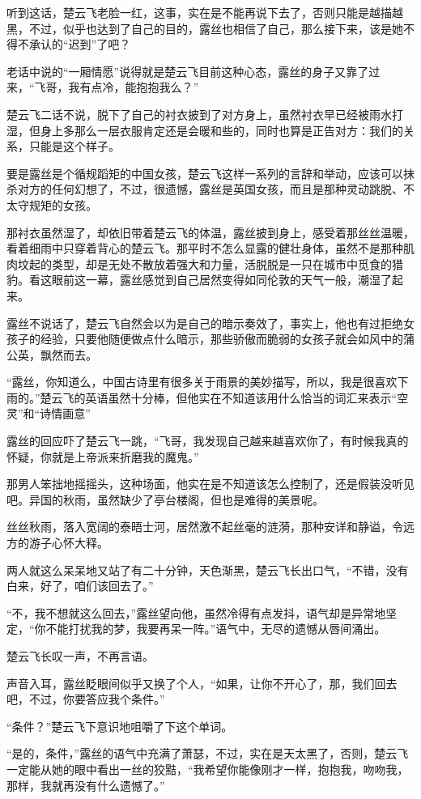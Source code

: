 听到这话，楚云飞老脸一红，这事，实在是不能再说下去了，否则只能是越描越黑，不过，似乎也达到了自己的目的，露丝也相信了自己，那么接下来，该是她不得不承认的“迟到”了吧？

老话中说的“一厢情愿”说得就是楚云飞目前这种心态，露丝的身子又靠了过来，“飞哥，我有点冷，能抱抱我么？”

楚云飞二话不说，脱下了自己的衬衣披到了对方身上，虽然衬衣早已经被雨水打湿，但身上多那么一层衣服肯定还是会暖和些的，同时也算是正告对方：我们的关系，只能是这个样子。

要是露丝是个循规蹈矩的中国女孩，楚云飞这样一系列的言辞和举动，应该可以抹杀对方的任何幻想了，不过，很遗憾，露丝是英国女孩，而且是那种灵动跳脱、不太守规矩的女孩。

那衬衣虽然湿了，却依旧带着楚云飞的体温，露丝披到身上，感受着那丝丝温暖，看着细雨中只穿着背心的楚云飞。那平时不怎么显露的健壮身体，虽然不是那种肌肉坟起的类型，却是无处不散放着强大和力量，活脱脱是一只在城市中觅食的猎豹。看这眼前这一幕，露丝感觉到自己居然变得如同伦敦的天气一般，潮湿了起来。

露丝不说话了，楚云飞自然会以为是自己的暗示奏效了，事实上，他也有过拒绝女孩子的经验，只要他随便做点什么暗示，那些骄傲而脆弱的女孩子就会如风中的蒲公英，飘然而去。

“露丝，你知道么，中国古诗里有很多关于雨景的美妙描写，所以，我是很喜欢下雨的。”楚云飞的英语虽然十分棒，但他实在不知道该用什么恰当的词汇来表示“空灵”和“诗情画意”

露丝的回应吓了楚云飞一跳，“飞哥，我发现自己越来越喜欢你了，有时候我真的怀疑，你就是上帝派来折磨我的魔鬼。”

那男人笨拙地摇摇头，这种场面，他实在是不知道该怎么控制了，还是假装没听见吧。异国的秋雨，虽然缺少了亭台楼阁，但也是难得的美景呢。

丝丝秋雨，落入宽阔的泰晤士河，居然激不起丝毫的涟漪，那种安详和静谥，令远方的游子心怀大释。

两人就这么呆呆地又站了有二十分钟，天色渐黑，楚云飞长出口气，“不错，没有白来，好了，咱们该回去了。”

“不，我不想就这么回去，”露丝望向他，虽然冷得有点发抖，语气却是异常地坚定，“你不能打扰我的梦，我要再呆一阵。”语气中，无尽的遗憾从唇间涌出。

楚云飞长叹一声，不再言语。

声音入耳，露丝眨眼间似乎又换了个人，“如果，让你不开心了，那，我们回去吧，不过，你要答应我个条件。”

“条件？”楚云飞下意识地咀嚼了下这个单词。

“是的，条件，”露丝的语气中充满了萧瑟，不过，实在是天太黑了，否则，楚云飞一定能从她的眼中看出一丝的狡黠，“我希望你能像刚才一样，抱抱我，吻吻我，那样，我就再没有什么遗憾了。”

